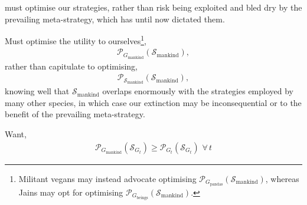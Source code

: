 \documentclass[twocolumn, aps, rmp, amsmath, amssymb, nofootinbib, superscriptaddress, longbibliography, floatfix, table-of-contents, eqsecnum]{revtex4-2}
\begin{document}
must optimise our strategies, rather than risk being exploited and bled dry by the prevailing meta-strategy, which has until now dictated them.

Must optimise the utility to ourselves\footnote{Militant vegans may instead advocate optimising $\mathcal{P}_{G_\text{pandas}}(\mathcal{S}_\text{mankind})$, whereas Jains may opt for optimising $\mathcal{P}_{G_\text{beings}}(\mathcal{S}_\text{mankind})$.},
\begin{align}
	\mathcal{P}_{G_\text{mankind}}(\mathcal{S}_\text{mankind}),
\end{align}
rather than capitulate to optimising,
\begin{align}
	\mathcal{P}_{\mathcal{S}_\text{mankind}}(\mathcal{S}_\text{mankind}),
\end{align}
knowing well that $\mathcal{S}_\text{mankind}$ overlaps enormously with the strategies employed by many other species, in which case our extinction may be inconsequential or to the benefit of the prevailing meta-strategy.

Want,
\begin{align}
\mathcal{P}_{G_\text{mankind}}(\mathcal{S}_{G_t}) \geq \mathcal{P}_{G_t}(\mathcal{S}_{G_t})\,\,\forall\, t
\end{align}


\end{document}
